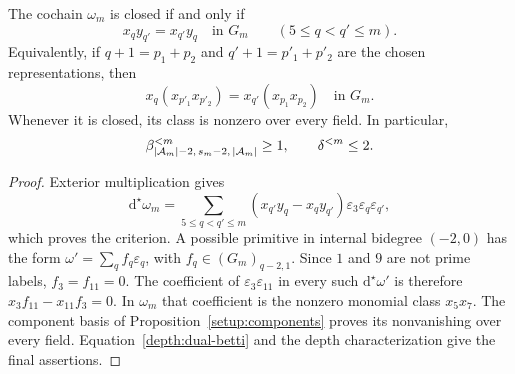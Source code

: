 \begin{proposition}\label{depth:dual-family-criterion}
The cochain $\omega_m$ is closed if and only if
\begin{equation}\label{depth:dual-cubic-identities}
 x_qy_{q'}=x_{q'}y_q\quad\text{in }G_m
 \qquad(5\le q<q'\le m).
\end{equation}
Equivalently, if $q+1=p_1+p_2$ and $q'+1=p'_1+p'_2$ are the
chosen representations, then
\[
 x_q(x_{p'_1}x_{p'_2})=x_{q'}(x_{p_1}x_{p_2})\quad\text{in }G_m.
\]
Whenever it is closed, its class is nonzero over every field. In
particular,
\[
 \beta^{<m}_{|\mathcal A_m|-2,\,s_m-2,\,|\mathcal A_m|}\ge1,
 \qquad \delta^{<m}\le2.
\]
\end{proposition}
\begin{proof}
Exterior multiplication gives
\[
 \mathrm{d}^\star\omega_m=
 \sum_{5\le q<q'\le m}(x_{q'}y_q-x_qy_{q'})
        \varepsilon_3\varepsilon_q\varepsilon_{q'},
\]
which proves the criterion. A possible primitive in internal
bidegree $(-2,0)$ has the form $\omega'=\sum_q f_q\varepsilon_q$, with
$f_q\in(G_m)_{q-2,1}$. Since $1$ and $9$ are not prime labels,
$f_3=f_{11}=0$. The coefficient of
$\varepsilon_3\varepsilon_{11}$ in every such $\mathrm{d}^\star\omega'$
is therefore $x_3f_{11}-x_{11}f_3=0$. In $\omega_m$ that coefficient is the nonzero
monomial class $x_5x_7$. The component basis of
Proposition~\ref{setup:components} proves its nonvanishing over every
field. Equation~\eqref{depth:dual-betti} and the depth characterization
give the final assertions.
\end{proof}

